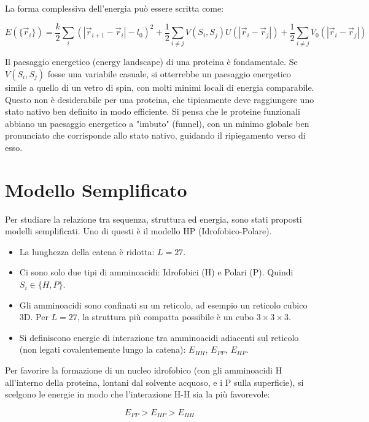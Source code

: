 La forma complessiva dell'energia può essere scritta come:

\begin{equation} \label{eq:ch23_18}
E(\{\vec{r}_i\}) = \frac{k}{2}\sum_{i}(\left|\vec{r}_{i+1}-\vec{r}_i\right|-l_0)^{2} + \frac{1}{2}\sum_{i \neq j}V(S_i,S_j)U(\left|\vec{r}_i-\vec{r}_j\right|) + \frac{1}{2}\sum_{i \neq j}V_0(\left|\vec{r}_i-\vec{r}_j\right|)
\end{equation}

Il paesaggio energetico (energy landscape) di una proteina è fondamentale. Se $V(S_i, S_j)$ fosse una variabile casuale, si otterrebbe un paesaggio energetico simile a quello di un vetro di spin, con molti minimi locali di energia comparabile. Questo non è desiderabile per una proteina, che tipicamente deve raggiungere uno stato nativo ben definito in modo efficiente.
Si pensa che le proteine funzionali abbiano un paesaggio energetico a "imbuto" (funnel), con un minimo globale ben pronunciato che corrisponde allo stato nativo, guidando il ripiegamento verso di esso.


\section{Modello Semplificato}
Per studiare la relazione tra sequenza, struttura ed energia, sono stati proposti modelli semplificati. Uno di questi è il modello HP (Idrofobico-Polare).
\begin{itemize}
    \item La lunghezza della catena è ridotta: $L=27$.
    \item Ci sono solo due tipi di amminoacidi: Idrofobici (H) e Polari (P). Quindi $S_i \in \{H, P\}$.
    \item Gli amminoacidi sono confinati su un reticolo, ad esempio un reticolo cubico 3D. Per $L=27$, la struttura più compatta possibile è un cubo $3 \times 3 \times 3$.
    \item Si definiscono energie di interazione tra amminoacidi adiacenti sul reticolo (non legati covalentemente lungo la catena): $E_{HH}$, $E_{PP}$, $E_{HP}$.
\end{itemize}

Per favorire la formazione di un nucleo idrofobico (con gli amminoacidi H all'interno della proteina, lontani dal solvente acquoso, e i P sulla superficie), si scelgono le energie in modo che l'interazione H-H sia la più favorevole:

\begin{equation} \label{eq:ch23_19}
E_{PP} > E_{HP} > E_{HH} 
\end{equation}

